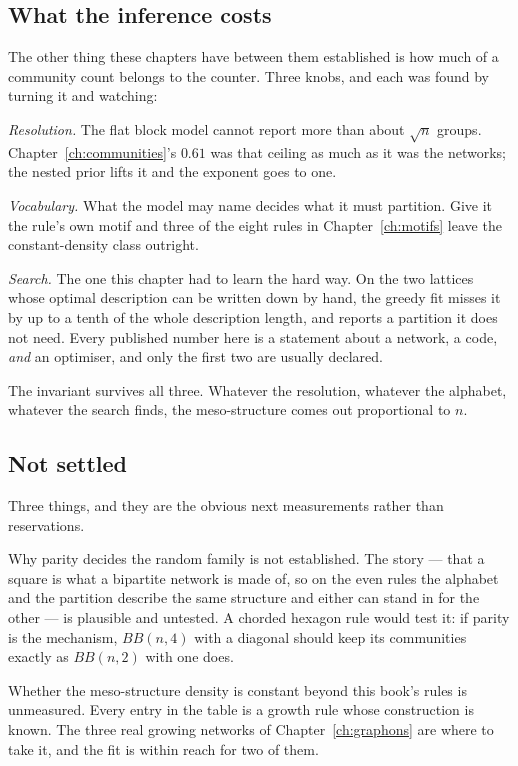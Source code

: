 \subsection*{What the inference costs}

The other thing these chapters have between them established is how much of a
community count belongs to the counter. Three knobs, and each was found by
turning it and watching:

\emph{Resolution.} The flat block model cannot report more than about $\sqrt n$
groups. Chapter~\ref{ch:communities}'s $0.61$ was that ceiling as much as it was
the networks; the nested prior lifts it and the exponent goes to one.

\emph{Vocabulary.} What the model may name decides what it must partition. Give
it the rule's own motif and three of the eight rules in Chapter~\ref{ch:motifs}
leave the constant-density class outright.

\emph{Search.} The one this chapter had to learn the hard way. On the two
lattices whose optimal description can be written down by hand, the greedy fit
misses it by up to a tenth of the whole description length, and reports a
partition it does not need. Every published number here is a statement about a
network, a code, \emph{and} an optimiser, and only the first two are usually
declared.

The invariant survives all three. Whatever the resolution, whatever the alphabet,
whatever the search finds, the meso-structure comes out proportional to $n$.

\subsection*{Not settled}

Three things, and they are the obvious next measurements rather than
reservations.

Why parity decides the random family is not established. The story --- that a
square is what a bipartite network is made of, so on the even rules the alphabet
and the partition describe the same structure and either can stand in for the
other --- is plausible and untested. A chorded hexagon rule would test it: if
parity is the mechanism, $BB(n,4)$ with a diagonal should keep its communities
exactly as $BB(n,2)$ with one does.

Whether the meso-structure density is constant beyond this book's rules is
unmeasured. Every entry in the table is a growth rule whose construction is
known. The three real growing networks of Chapter~\ref{ch:graphons} are where to
take it, and the fit is within reach for two of them.

